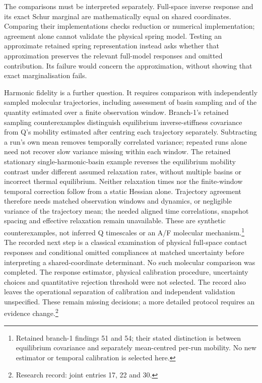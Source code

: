 \documentclass{article}
\begin{document}
The comparisons must be interpreted separately. Full-space inverse response and its exact Schur marginal are mathematically equal on shared coordinates. Comparing their implementations checks reduction or numerical implementation; agreement alone cannot validate the physical spring model. Testing an approximate retained spring representation instead asks whether that approximation preserves the relevant full-model responses and omitted contribution. Its failure would concern the approximation, without showing that exact marginalisation fails.

Harmonic fidelity is a further question. It requires comparison with independently sampled molecular trajectories, including assessment of basin sampling and of the quantity estimated over a finite observation window. Branch-1's retained sampling counterexamples distinguish equilibrium inverse-stiffness covariance from Q's mobility estimated after centring each trajectory separately. Subtracting a run's own mean removes temporally correlated variance; repeated runs alone need not recover slow variance missing within each window. The retained stationary single-harmonic-basin example reverses the equilibrium mobility contrast under different assumed relaxation rates, without multiple basins or incorrect thermal equilibrium. Neither relaxation times nor the finite-window temporal correction follow from a static Hessian alone. Trajectory agreement therefore needs matched observation windows and dynamics, or negligible variance of the trajectory mean; the needed aligned time correlations, snapshot spacing and effective relaxation remain unavailable. These are synthetic counterexamples, not inferred Q timescales or an A/F molecular mechanism.\footnote{Retained branch-1 findings 51 and 54; their stated distinction is between equilibrium covariance and separately mean-centred per-run mobility. No new estimator or temporal calibration is selected here.} The recorded next step is a classical examination of physical full-space contact responses and conditional omitted compliances at matched uncertainty before interpreting a shared-coordinate determinant. No such molecular comparison was completed. The response estimator, physical calibration procedure, uncertainty choices and quantitative rejection threshold were not selected. The record also leaves the operational separation of calibration and independent validation unspecified. These remain missing decisions; a more detailed protocol requires an evidence change.\footnote{Research record: joint entries 17, 22 and 30.}
\end{document}
